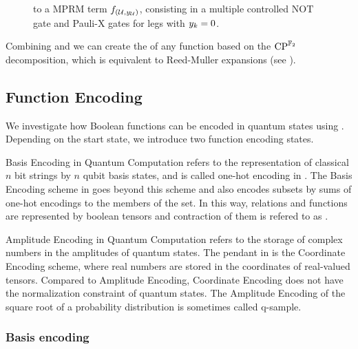 \begin{figure}
    \begin{center}
        
    \end{center}
    \caption{
        \ComputationCircuit{} to a MPRM term $f_{(\mathcal{U},y_{\mathcal{U}})}$, consisting in a multiple controlled $\mathrm{NOT}$ gate and Pauli-X gates for legs with $y_{k}=0$.
    }\label{fig:qcbencodingPolynomial}
\end{figure}


Combining  and  we can create the \computationCircuit{} of any function based on the $\mathrm{CP}^{\mathbb{F}_2}$ decomposition, which is equivalent to Reed-Muller expansions (see ).


\subsection{Function Encoding}

We investigate how Boolean functions can be encoded in quantum states using \computationCircuits{}.
Depending on the start state, we introduce two function encoding states.

\begin{remark}
    Basis Encoding in Quantum Computation refers to the representation of classical $n$ bit strings by $n$ qubit basis states, and is called one-hot encoding in \tnreason{}.
    The Basis Encoding scheme in \tnreason{} goes beyond this scheme and also encodes subsets by sums of one-hot encodings to the members of the set.
    In this way, relations and functions are represented by boolean tensors and contraction of them is refered to as \BasisCalculus{}.

    Amplitude Encoding in Quantum Computation refers to the storage of complex numbers in the amplitudes of quantum states.
    The pendant in \tnreason{} is the Coordinate Encoding scheme, where real numbers are stored in the coordinates of real-valued tensors.
    Compared to Amplitude Encoding, Coordinate Encoding does not have the normalization constraint of quantum states.
    The Amplitude Encoding of the square root of a probability distribution is sometimes called q-sample.
\end{remark}

\subsubsection{Basis encoding}


